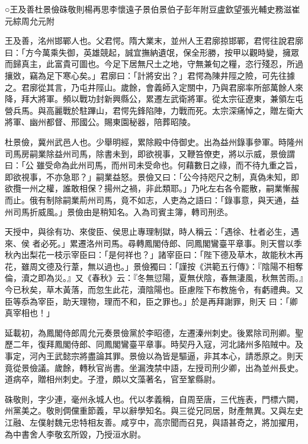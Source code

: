 
\begin{pinyinscope}

 ○王及善杜景儉硃敬則楊再思李懷遠子景伯景伯子彭年附豆盧欽望張光輔史務滋崔元綜周允元附



 王及善，洺州邯鄲人也。父君愕。隋大業末，並州人王君廓掠邯鄲，君愕往說君廓曰：「方今萬乘失御，英雄競起，誠宜撫納遺氓，保全形勝，按甲以觀時變，擁眾而歸真主，此富貴可圖也。今足下居無尺土之地，守無兼旬之糧，恣行殘忍，所過攘敚，竊為足下寒心矣。」君廓曰：「計將安出？」君愕為陳井陘之險，可先往據之。君廓從其言，乃屯井陘山。歲餘，會義師入定關中，乃與君廓率所部萬餘人來降，拜大將軍。頻以戰功封新興縣公，累遷左武衛將軍。從太宗征遼東，兼領左屯營兵馬。與高麗戰於駐蹕山，君愕先鋒陷陣，力戰而死。太宗深痛悼之，贈左衛大將軍、幽州都督、邢國公。賜東園秘器，陪葬昭陵。



 杜景儉，冀州武邑人也。少舉明經，累除殿中侍御史。出為益州錄事參軍。時隆州司馬房嗣業除益州司馬，除書未到，即欲視事，又鞭笞僚吏，將以示威，景儉謂曰：「公
 雖受命為此州司馬，而州司未受命也。何藉數日之祿，而不待九重之旨，即欲視事，不亦急耶？」嗣業益怒。景儉又曰：「公今持咫尺之制，真偽未知，即欲攬一州之權，誰敢相保？揚州之禍，非此類耶。」乃叱左右各令罷散，嗣業慚赧而止。俄有制除嗣業荊州司馬，竟不如志，人吏為之語曰：「錄事意，與天通，益州司馬折威風。」景儉由是稍知名。入為司賓主簿，轉司刑丞。



 天授中，與徐有功、來俊臣、侯思止專理制獄，時人稱云：「遇徐、杜者必生，遇來、侯
 者必死。」累遷洛州司馬。尋轉鳳閣侍郎、同鳳閣鸞臺平章事。則天嘗以季秋內出梨花一枝示宰臣曰：「是何祥也？」諸宰臣曰：「陛下德及草木，故能秋木再花，雖周文德及行葦，無以過也。」景儉獨曰：「謹按《洪範五行傳》：『陰陽不相奪倫，瀆之即為災。』又《春秋》云：『冬無愆陽，夏無伏陰，春無淒風，秋無苦雨。』今已秋矣，草木黃落，而忽生此花，瀆陰陽也。臣慮陛下布教施令，有虧禮典。又臣等忝為宰臣，助天理物，理而不和，臣之罪也。」於是再拜謝罪，則天
 曰：「卿真宰相也！」



 延載初，為鳳閣侍郎周允元奏景儉黨於李昭德，左遷溱州刺史。後累除司刑卿。聖歷二年，復拜鳳閣侍郎、同鳳閣鸞臺平章事。時契丹入寇，河北諸州多陷賊中。及事定，河內王武懿宗將盡論其罪。景儉以為皆是驅逼，非其本心，請悉原之。則天竟從景儉議。歲餘，轉秋官尚書。坐漏洩禁中語，左授司刑少卿，出為並州長史。道病卒，贈相州刺史。子澄，頗以文藻著名，官至鞏縣尉。



 硃敬則，字少連，毫州永城人也。代以孝義稱，自周至唐，三代旌表，門標六闕，州黨美之。敬則倜儻重節義，早以辭學知名。與三從兄同居，財產無異。又與左史江融、左僕射魏元忠特相友善。咸亨中，高宗聞而召見，與語甚奇之，將加擢用，為中書舍人李敬玄所毀，乃授洹水尉。




\end{pinyinscope}
